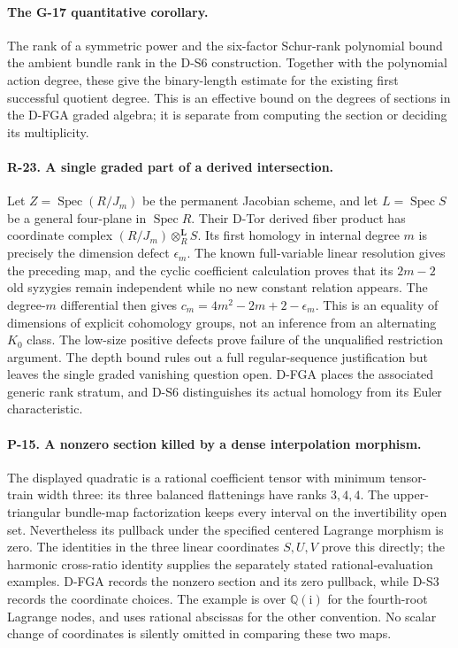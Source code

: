 \documentclass[11pt,a4paper]{article}
\theoremstyle{definition}\newtheorem{definition}{Definition}
\begin{document}
\paragraph{The G-17 quantitative corollary.}
The rank of a symmetric power and the six-factor Schur-rank polynomial
bound the ambient bundle rank in the D-S6 construction. Together with
the polynomial action degree, these give the binary-length estimate
for the existing first successful quotient degree. This is an effective
bound on the degrees of sections in the D-FGA graded algebra; it is
separate from computing the section or deciding its multiplicity.


\paragraph{R-23. A single graded part of a derived intersection.}
Let $Z=\operatorname{Spec}(R/J_m)$ be the permanent Jacobian scheme,
and let $L=\operatorname{Spec}S$ be a general four-plane in
$\operatorname{Spec}R$. Their D-Tor derived fiber product has
coordinate complex $(R/J_m)\otimes_R^{\mathbf L}S$.
Its first homology in internal degree $m$ is precisely the dimension
defect $\epsilon_m$. The known full-variable linear resolution gives
the preceding map, and the cyclic coefficient calculation proves
that its $2m-2$ old syzygies remain independent while no new constant
relation appears. The degree-$m$ differential then gives
$c_m=4m^2-2m+2-\epsilon_m$. This is an equality of dimensions of
explicit cohomology groups, not an inference from an alternating
$K_0$ class. The low-size positive defects prove failure of the
unqualified restriction argument. The depth bound rules out a full
regular-sequence justification but leaves the single graded
vanishing question open. D-FGA places the associated generic rank
stratum, and D-S6 distinguishes its actual homology from its
Euler characteristic.

\paragraph{P-15. A nonzero section killed by a dense interpolation morphism.}
The displayed quadratic is a rational coefficient tensor with
minimum tensor-train width three: its three balanced flattenings
have ranks $3,4,4$. The upper-triangular bundle-map factorization
keeps every interval on the invertibility open set. Nevertheless
its pullback under the specified centered Lagrange morphism is
zero. The identities in the three linear coordinates $S,U,V$
prove this directly; the harmonic cross-ratio identity supplies
the separately stated rational-evaluation examples. D-FGA records
the nonzero section and its zero pullback, while D-S3 records the
coordinate choices. The example is over $\mathbb Q(\mathrm i)$
for the fourth-root Lagrange nodes, and uses rational abscissas
for the other convention. No scalar change of coordinates is
silently omitted in comparing these two maps.
\end{document}
